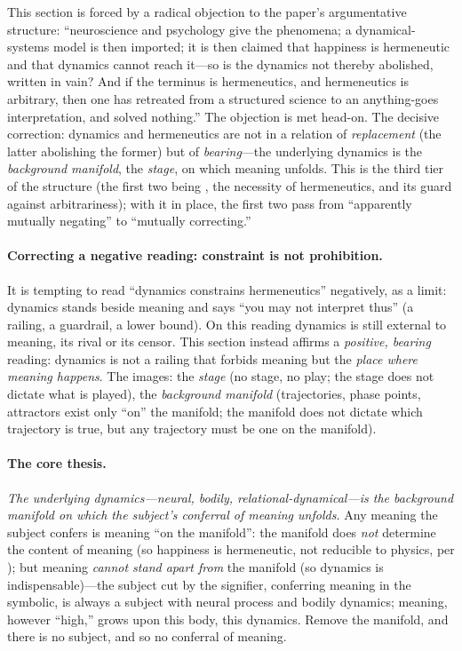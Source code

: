 This section is forced by a radical objection to the paper's argumentative structure: ``neuroscience and psychology give the phenomena; a dynamical-systems model is then imported; it is then claimed that happiness is hermeneutic and that dynamics cannot reach it---so is the dynamics not thereby abolished, written in vain? And if the terminus is hermeneutics, and hermeneutics is arbitrary, then one has retreated from a structured science to an anything-goes interpretation, and solved nothing.'' The objection is met head-on. The decisive correction: dynamics and hermeneutics are not in a relation of \emph{replacement} (the latter abolishing the former) but of \emph{bearing}---the underlying dynamics is the \emph{background manifold}, the \emph{stage}, on which meaning unfolds. This is the third tier of the structure (the first two being , the necessity of hermeneutics, and its guard against arbitrariness); with it in place, the first two pass from ``apparently mutually negating'' to ``mutually correcting.''

\paragraph{Correcting a negative reading: constraint is not prohibition.} It is tempting to read ``dynamics constrains hermeneutics'' negatively, as a limit: dynamics stands beside meaning and says ``you may not interpret thus'' (a railing, a guardrail, a lower bound). On this reading dynamics is still external to meaning, its rival or its censor. This section instead affirms a \emph{positive, bearing} reading: dynamics is not a railing that forbids meaning but the \emph{place where meaning happens}. The images: the \emph{stage} (no stage, no play; the stage does not dictate what is played), the \emph{background manifold} (trajectories, phase points, attractors exist only ``on'' the manifold; the manifold does not dictate which trajectory is true, but any trajectory must be one on the manifold).

\paragraph{The core thesis.} \emph{The underlying dynamics---neural, bodily, relational-dynamical---is the background manifold on which the subject's conferral of meaning unfolds.} Any meaning the subject confers is meaning ``on the manifold'': the manifold does \emph{not} determine the content of meaning (so happiness is hermeneutic, not reducible to physics, per ); but meaning \emph{cannot stand apart from} the manifold (so dynamics is indispensable)---the subject cut by the signifier, conferring meaning in the symbolic, is always a subject with neural process and bodily dynamics; meaning, however ``high,'' grows upon this body, this dynamics. Remove the manifold, and there is no subject, and so no conferral of meaning.

